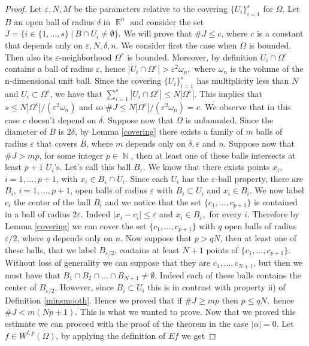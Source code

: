 \documentclass[12pt]{article}
\theoremstyle{definition}
\DeclareMathOperator\rr{\mathbb{R}}
\DeclareMathOperator\nn{\mathbb{N}}
\begin{document}
\begin{proof}
Let  $\varepsilon,N,M$ be the parameters relative to the covering $\{ U_i\}_{i=1}^s$ for $\Omega$. Let $B$ an open ball of radius $\delta$ in $\rr^n$ and consider the set $J=\{i \in \{1,...,s\} \ | \ B\cap U_i \neq \emptyset\}$. We will prove that $\#J\le c$, where $c$ is a constant that depends only on $\varepsilon,N,\delta,n.$ We consider first the case when $\Omega$ is bounded. Then also its $\varepsilon$-neighborhood $\Omega^\varepsilon $ is bounded. Moreover, by definition $U_i\cap \Omega^\varepsilon$ contains a ball of radius $\varepsilon$, hence $|U_i\cap \Omega^\varepsilon|>\varepsilon^2\omega_n,$ where $\omega_n$ is the volume of the n-dimensional unit ball. Since the covering $\{U_i\}_{i=1}^s$ has multiplicity less than $N$ and $U_i\subset\Omega^\varepsilon$, we have that $\sum_{i=1}^s|U_i\cap \Omega^\varepsilon|\le N |\Omega^\varepsilon|$. This implies that $s\le N |\Omega^\varepsilon|/(\varepsilon^2\omega_n)$ and so $\#J\le N |\Omega^\varepsilon|/(\varepsilon^2\omega_n)=c.$ We observe that in this case $c$ doesn't depend on $\delta.$ Suppose now that $\Omega$ is unbounded. Since the diameter of $B$ is $2\delta$, by Lemma \ref{covering} there exists a family of $m$ balls of radius $\varepsilon$ that covers $B$, where $m$ depends only on $\delta,\varepsilon$ and $n$. Suppose now that $\#J>mp$, for some integer $p\in \nn$, then at least one of these balls intersects at least $p+1$  $U_i$'s. Let's call this ball $B_\varepsilon.$ We know that there exists points $x_i$, $i=1,...,p+1$, with $x_i \in B_\varepsilon \cap U_i.$ Since each $U_i$ has the $\varepsilon$-ball property, there are $B_i$, $i=1,...,p+1$, open balls of radius $\varepsilon$ with $B_i \subset U_i$ and $x_i \in B_i.$ We now label $c_i$ the center of the ball $B_i$ and we notice that the set $\{c_1,...,c_{p+1}\}$ is contained in a ball of radius $2\varepsilon.$ Indeed $|x_i-c_i|\le \varepsilon$ and $x_i \in B_\varepsilon,$ for every $i.$ Therefore by Lemma \ref{covering} we can cover the set $\{c_1,...,c_{p+1}\}$ with $q$ open balls of radius $\varepsilon/2$, where $q$ depends only on $n.$ Now suppose that $p>qN$, then at least one of these balls, that we label $B_{\varepsilon/2}$, contains at least $N+1$ points of $\{c_1,...,c_{p+1}\}.$ Without loss of generality we can suppose that they are $c_1,...,c_{N+1}$, but then we must have that $B_1\cap B_2 \cap ... \cap B_{N+1}\neq \emptyset$. Indeed each of these balls contains the center of $B_{\varepsilon/2}.$ However, since $B_i \subset U_i$ this is in contrast with property ii) of Definition \ref{minsmooth}. Hence we proved that if $\#J\ge mp$ then $p\le qN,$ hence $\#J<m(Np+1) $. This is what we wanted to prove. Now that we proved this estimate we can proceed with the proof of the theorem in the case $|\alpha|=0.$ Let $f \in W^{l,p}(\Omega)$, by applying the definition of $Ef$ we get


\end{proof}
\end{document}
